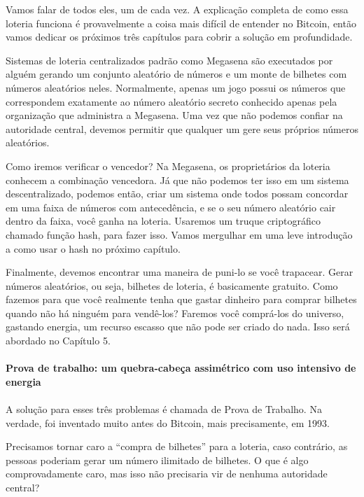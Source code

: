 
Vamos falar de todos eles, um de cada vez. A explicação completa de como essa loteria funciona é provavelmente a coisa mais difícil de entender no Bitcoin, então vamos dedicar os próximos três capítulos para cobrir a solução em profundidade.

Sistemas de loteria centralizados padrão como Megasena são executados por alguém gerando um conjunto aleatório de números e um monte de bilhetes com números aleatórios neles. Normalmente, apenas um jogo possui os números que correspondem exatamente ao número aleatório secreto conhecido apenas pela organização que administra a Megasena. Uma vez que não podemos confiar na autoridade central, devemos permitir que qualquer um gere seus próprios números aleatórios.

Como iremos verificar o vencedor? Na Megasena, os proprietários da loteria conhecem a combinação vencedora. Já que não podemos ter isso em um sistema descentralizado, podemos então, criar um sistema onde todos possam concordar em uma faixa de números com antecedência, e se o seu número aleatório cair dentro da faixa, você ganha na loteria. Usaremos um truque criptográfico chamado função hash, para fazer isso. Vamos mergulhar em uma leve introdução a como usar o hash no próximo capítulo.

Finalmente, devemos encontrar uma maneira de puni-lo se você trapacear. Gerar números aleatórios, ou seja, bilhetes de loteria, é basicamente gratuito. Como fazemos para que você realmente tenha que gastar dinheiro para comprar bilhetes quando não há ninguém para vendê-los? Faremos você comprá-los do universo, gastando energia, um recurso escasso que não pode ser criado do nada. Isso será abordado no Capítulo 5.

\paragraph{Prova de trabalho: um quebra-cabeça assimétrico com uso intensivo de energia}
\paragraph{}
A solução para esses três problemas é chamada de Prova de Trabalho. Na verdade, foi inventado muito antes do Bitcoin, mais precisamente, em 1993.

Precisamos tornar caro a “compra de bilhetes” para a loteria, caso contrário, as pessoas poderiam gerar um número ilimitado de bilhetes. O que é algo comprovadamente caro, mas isso não precisaria vir de nenhuma autoridade central?

